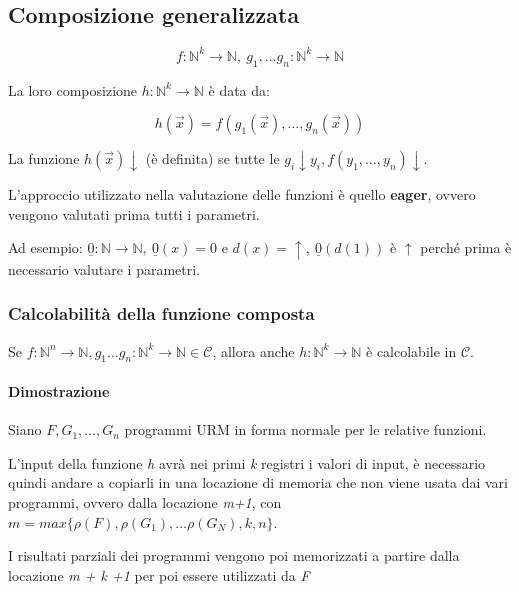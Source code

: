 \subsection{Composizione generalizzata}\label{composizione-generalizzata}

$$f: \mathbb{N}^k \rightarrow \mathbb{N},\: g_1,\ldots g_n : \mathbb{N}^k \rightarrow \mathbb{N}$$

La loro composizione $h: \mathbb{N}^k \rightarrow \mathbb{N}$ è data da: 

$$
h(\vec{x}) = f(g_1(\vec{x}), \ldots, g_n(\vec{x}))
$$

La funzione $h(\vec{x})\downarrow$ (è definita) se tutte le
$g_i \downarrow y_i, f(y_1,\ldots,y_n) \downarrow$.

L'approccio utilizzato nella valutazione delle funzioni è quello
\textbf{eager}, ovvero vengono valutati prima tutti i parametri.

Ad esempio: $\underline{0} : \mathbb{N} \rightarrow \mathbb{N},\: \underline{0}(x) = 0$ e $d(x) = \uparrow,\: \underline{0}(d(1))$ è
$\uparrow$ perché prima è necessario valutare i parametri.

\subsubsection{Calcolabilità della funzione
composta}\label{calcolabilituxe0-della-funzione-composta}

Se $f: \mathbb{N}^n \rightarrow \mathbb{N}, g_1\ldots g_n : \mathbb{N}^k \rightarrow \mathbb{N} \in \mathcal{C}$, allora anche $h: \mathbb{N}^k \rightarrow \mathbb{N}$ è calcolabile in $\mathcal{C}$.

\paragraph{Dimostrazione}\label{dimostrazione}

Siano $F,G_1, \ldots{}, G_n$ programmi URM in forma normale per
le relative funzioni.

L'input della funzione \emph{h} avrà nei primi \emph{k} registri i
valori di input, è necessario quindi andare a copiarli in una locazione
di memoria che non viene usata dai vari programmi, ovvero dalla
locazione \emph{m+1}, con $m = max\{\rho(F), \rho(G_1), \ldots \rho(G_N), k,n\}$.

I risultati parziali dei programmi vengono poi memorizzati a partire
dalla locazione \emph{m + k +1} per poi essere utilizzati da \emph{F}

